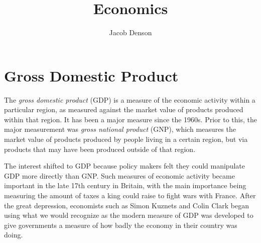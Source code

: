 

\title{Economics}
\author{Jacob Denson}



\maketitle
\tableofcontents
{}

\chapter{Gross Domestic Product}

The \emph{gross domestic product} (GDP) is a measure of the economic activity within a particular region, as measured against the market value of products produced within that region. It has been a major measure since the 1960s. Prior to this, the major measurement was \emph{gross national product} (GNP), which measures the market value of products produced by people living in a certain region, but via products that may have been produced outside of that region.

The interest shifted to GDP because policy makers felt they could manipulate GDP more directly than GNP. Such measures of economic activity became important in the late 17th century in Britain, with the main importance being measuring the amount of taxes a king could raise to fight wars with France. After the great depression, economists such as Simon Kuznets and Colin Clark began using what we would recognize as the modern measure of GDP was developed to give governments a measure of how badly the economy in their country was doing.

